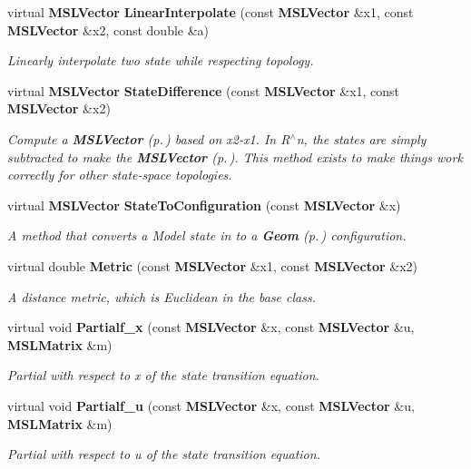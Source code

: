 \begin{CompactItemize}
virtual {\bf MSLVector} {\bf Linear\-Interpolate} (const {\bf MSLVector} \&x1, const {\bf MSLVector} \&x2, const double \&a)
\begin{CompactList}\small\item\em Linearly interpolate two state while respecting topology.\item\end{CompactList}\item 
virtual {\bf MSLVector} {\bf State\-Difference} (const {\bf MSLVector} \&x1, const {\bf MSLVector} \&x2)
\begin{CompactList}\small\item\em Compute a {\bf MSLVector} {\rm (p.\,\pageref{classMSLVector})} based on x2-x1. In R$^\wedge$n, the states are simply subtracted to make the {\bf MSLVector} {\rm (p.\,\pageref{classMSLVector})}. This method exists to make things work correctly for other state-space topologies.\item\end{CompactList}\item 
virtual {\bf MSLVector} {\bf State\-To\-Configuration} (const {\bf MSLVector} \&x)
\begin{CompactList}\small\item\em A method that converts a Model state in to a {\bf Geom} {\rm (p.\,\pageref{classGeom})} configuration.\item\end{CompactList}\item 
virtual double {\bf Metric} (const {\bf MSLVector} \&x1, const {\bf MSLVector} \&x2)
\begin{CompactList}\small\item\em A distance metric, which is Euclidean in the base class.\item\end{CompactList}\item 
virtual void {\bf Partialf\_\-x} (const {\bf MSLVector} \&x, const {\bf MSLVector} \&u, {\bf MSLMatrix} \&m)
\begin{CompactList}\small\item\em Partial with respect to x of the state transition equation.\item\end{CompactList}\item 
virtual void {\bf Partialf\_\-u} (const {\bf MSLVector} \&x, const {\bf MSLVector} \&u, {\bf MSLMatrix} \&m)
\begin{CompactList}\small\item\em Partial with respect to u of the state transition equation.\item\end{CompactList}\item 

\end{CompactItemize}

